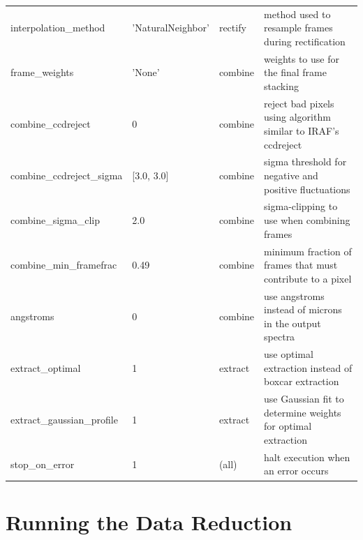 \documentclass[a4paper]{article}
\begin{document}
\begin{sloppypar}
\begin{table}
{\begin{tabular}{llll}
    interpolation\_method         & 'NaturalNeighbor'  & rectify     & method used to resample frames during rectification \\
    frame\_weights                & 'None'        & combine          & weights to use for the final frame stacking \\
    combine\_ccdreject            & 0             & combine          & reject bad pixels using algorithm similar to IRAF's ccdreject \\
    combine\_ccdreject\_sigma     & [3.0, 3.0]    & combine          & sigma threshold for negative and positive fluctuations \\
    combine\_sigma\_clip          & 2.0           & combine          & sigma-clipping to use when combining frames \\
    combine\_min\_framefrac       & 0.49          & combine          & minimum fraction of frames that must contribute to a pixel \\
    angstroms                     & 0             & combine          & use angstroms instead of microns in the output spectra \\
    extract\_optimal              & 1             & extract          & use optimal extraction instead of boxcar extraction \\
    extract\_gaussian\_profile    & 1             & extract          & use Gaussian fit to determine weights for optimal extraction \\
    stop\_on\_error               & 1             & (all)            & halt execution when an error occurs \\
    \hline
  \end{tabular}
  }
\end{table}







\section{Running the Data Reduction}
\label{sec:data_reduction}


\end{sloppypar}
\end{document}
